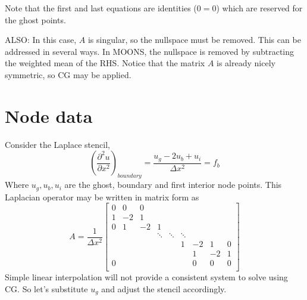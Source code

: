 \documentclass[landscape]{article}
\begin{document}
Note that the first and last equations are identities ($0=0$) which are reserved for the ghost points.

ALSO: In this case, $A$ is singular, so the nullspace must be removed. This can be addressed in several ways. In MOONS, the nullspace is removed by subtracting the weighted mean of the RHS. Notice that the matrix $A$ is already nicely symmetric, so CG may be applied.

\newpage
\section{Node data}
Consider the Laplace stencil,
\begin{equation}
   \left(\frac{\partial^2 u}{\partial x^2}\right)_{boundary} = 
   \frac{u_g - 2 u_b + u_i}{\Delta x^2} = f_b
\end{equation}
Where $u_g,u_b,u_i$ are the ghost, boundary and first interior node points. This Laplacian operator may be written in matrix form as
\[ A = \frac{1}{\Delta x^2} \left[\begin{array}{ccccccccc}
0  & 0     & 0         &           &           &           &           &         &    \\
1  & -2    & 1         &           &           &           &           &         &    \\
0  & 1     & -2        & 1         &           &           &           &         &    \\
   &       &           & \ddots    & \ddots    & \ddots    &           &         &    \\
   &       &           &           &           & 1         & -2        & 1       &  0 \\
   &       &           &           &           &           &  1        & -2      &  1 \\
0  &       &           &           &           &           &  0        & 0       &  0 \\
\end{array} \right]
\]
Simple linear interpolation will not provide a consistent system to solve using CG. So let's substitute $u_g$ and adjust the stencil accordingly.
\end{document}
